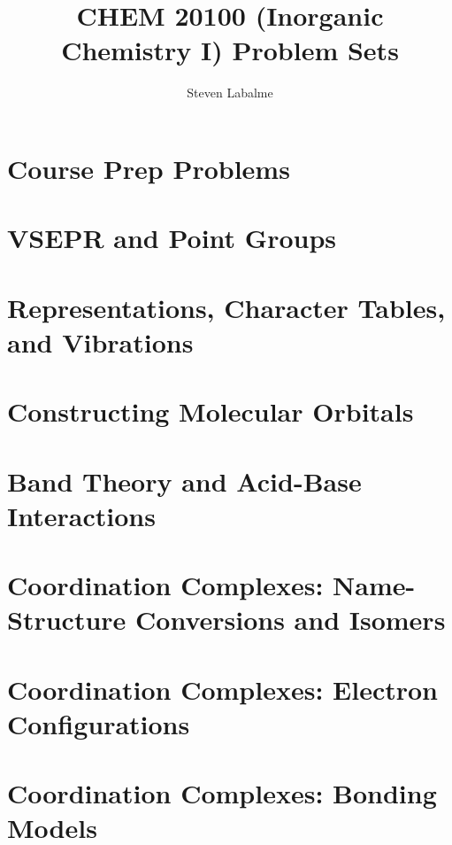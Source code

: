 \documentclass[titlepage]{article}
\title{CHEM 20100 (Inorganic Chemistry I) Problem Sets}
\author{Steven Labalme}
\begin{document}
\maketitle



\tableofcontents
\newpage



\pagestyle{main}
\renewcommand{\leftmark}{Problem Set \thesection}
\setcounter{section}{-1}
\section{Course Prep Problems}

\newpage



\section{VSEPR and Point Groups}

\newpage



\section{Representations, Character Tables, and Vibrations}

\newpage



\section{Constructing Molecular Orbitals}

\newpage



\section{Band Theory and Acid-Base Interactions}

\newpage



\section{Coordination Complexes: Name-Structure Conversions and Isomers}

\newpage



\section{Coordination Complexes: Electron Configurations}

\newpage



\section{Coordination Complexes: Bonding Models}

\newpage



\printbibliography[heading=bibintoc]
\end{document}
